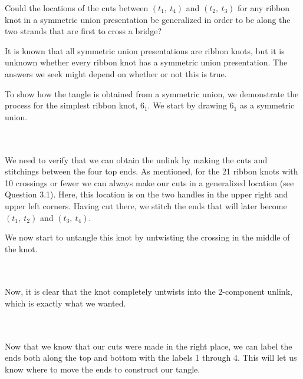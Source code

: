 \documentclass{ws-jktr}
\begin{document}
\vspace{-2em}\begin{question}
Could the locations of the cuts between $(t_1,~t_4)$ and $(t_2,~t_3)$ for any
ribbon knot in a symmetric union presentation be generalized in order to be
along the two strands that are first to cross a bridge?
\end{question}

It is known that all symmetric union presentations are ribbon knots, but it is
unknown whether every ribbon knot has a symmetric union presentation.
The answers we seek might depend on whether or not this is true.

To show how the tangle is obtained from a symmetric union, we demonstrate the
process for the simplest ribbon knot, $6_1$.
We start by drawing $6_1$ as a symmetric union.

\\\\

We need to verify that we can obtain the unlink by making the cuts and
stitchings between the four top ends.
As mentioned, for the 21 ribbon knots with 10 crossings or fewer we can always
make our cuts in a generalized location (see Question 3.1).
Here, this location is on the two handles in the upper right and upper left
corners.
Having cut there, we stitch the ends that will later become $(t_1,~t_2)$ and
$(t_3,~t_4)$.\\


We now start to untangle this knot by untwisting the crossing in the middle of
the knot.

\\\\

Now, it is clear that the knot completely untwists into the 2-component unlink,
which is exactly what we wanted.

\\\\

Now that we know that our cuts were made in the right place, we can label
the ends both along the top and bottom with the labels 1 through 4.
This will let us know where to move the ends to construct our tangle.
\end{document}
